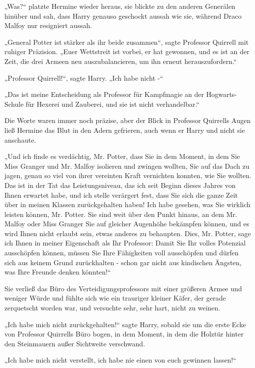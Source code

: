 {„Was?“ platzte Hermine wieder heraus, sie blickte zu den anderen Generälen hinüber und sah, dass Harry genauso geschockt aussah wie sie, während Draco Malfoy nur resigniert aussah.

„General Potter ist stärker als ihr beide zusammen“, sagte Professor Quirrell mit ruhiger Präzision. „Euer Wettstreit ist vorbei, er hat gewonnen, und es ist an der Zeit, die drei Armeen neu auszubalancieren, um ihn erneut herauszufordern.“

„Professor Quirrell!“, sagte Harry. „Ich habe nicht -“

„Das ist meine Entscheidung als Professor für Kampfmagie an der Hogwarts-Schule für Hexerei und Zauberei, und sie ist nicht verhandelbar.“

Die Worte waren immer noch präzise, aber der Blick in Professor Quirrells Augen ließ Hermine das Blut in den Adern gefrieren, auch wenn er Harry und nicht sie anschaute.

„Und ich finde es verdächtig, Mr. Potter, dass Sie in dem Moment, in dem Sie Miss Granger und Mr. Malfoy isolieren und zwingen wollten, Sie auf das Dach zu jagen, genau so viel von ihrer vereinten Kraft vernichten konnten, wie Sie wollten. Das ist in der Tat das Leistungsniveau, das ich seit Beginn dieses Jahres von Ihnen erwartet habe, und ich stelle verärgert fest, dass Sie sich die ganze Zeit über in meinen Klassen zurückgehalten haben! Ich habe gesehen, was Sie wirklich leisten können, Mr. Potter. Sie sind weit über den Punkt hinaus, an dem Mr. Malfoy oder Miss Granger Sie auf gleicher Augenhöhe bekämpfen können, und es wird Ihnen nicht erlaubt sein, etwas anderes zu behaupten. Dies, Mr. Potter, sage ich Ihnen in meiner Eigenschaft als Ihr Professor: Damit Sie Ihr volles Potenzial ausschöpfen können, müssen Sie Ihre Fähigkeiten voll ausschöpfen und dürfen sich aus keinem Grund zurückhalten - schon gar nicht aus kindischen Ängsten, was Ihre Freunde denken könnten!“

Sie verließ das Büro des Verteidigungsprofessors mit einer größeren Armee und weniger Würde und fühlte sich wie ein trauriger kleiner Käfer, der gerade zerquetscht worden war, und versuchte sehr, sehr hart, nicht zu weinen.

„Ich habe mich nicht zurückgehalten!“ sagte Harry, sobald sie um die erste Ecke von Professor Quirrells Büro bogen, in dem Moment, in dem die Holztür hinter den Steinmauern außer Sichtweite verschwand.

„Ich habe mich nicht verstellt, ich habe nie einen von euch gewinnen lassen!“

}
